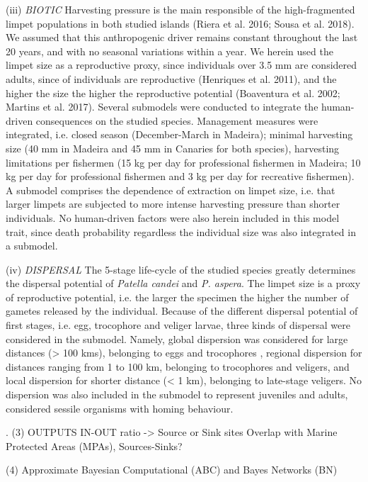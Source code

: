 \documentclass[12pt]{article}
\begin{document}
\begin{flushleft}
(iii) \textit{BIOTIC}
Harvesting pressure is the main responsible of the high-fragmented limpet populations in both studied islands (Riera et al. 2016; Sousa et al. 2018). We assumed that this anthropogenic driver remains constant throughout the last 20 years, and with no seasonal variations within a year. We herein used the limpet size as a reproductive proxy, since individuals over 3.5 mm are considered adults, since  of individuals are reproductive (Henriques et al. 2011), and the higher the size the higher the reproductive potential (Boaventura et al. 2002; Martins et al. 2017). Several submodels were conducted to integrate the human-driven consequences on the studied species. Management measures were integrated, i.e. closed season (December-March in Madeira); minimal harvesting size (40 mm in Madeira and 45 mm in Canaries for both species), harvesting limitations per fishermen (15 kg per day for professional fishermen in Madeira; 10 kg per day for professional fishermen and 3 kg per day for recreative fishermen). A submodel comprises the dependence of extraction on limpet size, i.e. that larger limpets are subjected to more intense harvesting pressure than shorter individuals.
No human-driven factors were also herein included in this model trait, since death probability regardless the individual size was also integrated in a submodel.

(iv) \textit{DISPERSAL}
The 5-stage life-cycle of the studied species greatly determines the dispersal potential of \textit{Patella candei} and \textit{P. aspera}. The limpet size is a proxy of reproductive potential, i.e. the larger the specimen the higher the number of gametes released by the individual. Because of the different dispersal potential of first stages, i.e. egg, trocophore and veliger larvae, three kinds of dispersal were considered in the submodel. Namely, global dispersion was considered for large distances (> 100 kms), belonging to eggs and trocophores , regional dispersion for distances ranging from 1 to 100 km, belonging to trocophores and veligers, and local dispersion for shorter distance (< 1 km), belonging to late-stage veligers. No dispersion was also included in the submodel to represent juveniles and adults, considered sessile organisms with homing behaviour.

. 
(3) OUTPUTS
IN-OUT ratio -> Source or Sink sites
Overlap with Marine Protected Areas (MPAs), Sources-Sinks?

(4) Approximate Bayesian Computational (ABC) and Bayes Networks (BN)


\end{flushleft}
\end{document}
